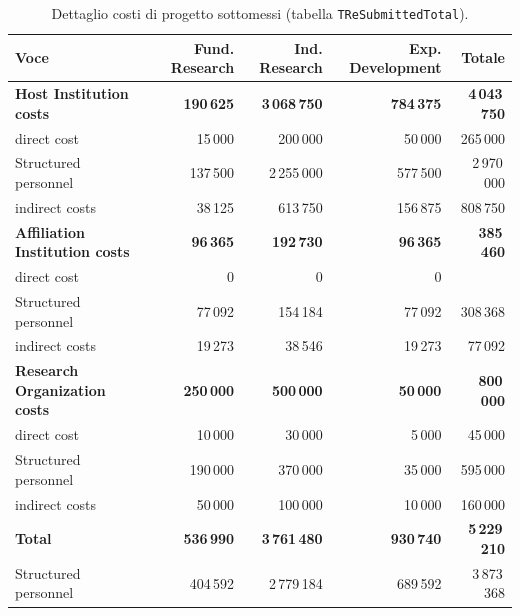 \documentclass{plan4ari_report}
\begin{document}
\begin{table}[H]\centering\small
\caption{Dettaglio costi di progetto sottomessi (tabella \texttt{TReSubmittedTotal}).}\label{tab:age-cost}
\begin{tabular}{lrrrr}\toprule
\textbf{Voce} & \textbf{Fund. Research} & \textbf{Ind. Research} & \textbf{Exp. Development} & \textbf{Totale} \\\midrule
\textbf{Host Institution costs} & \textbf{190\,625} & \textbf{3\,068\,750} & \textbf{784\,375} & \textbf{4\,043\,750} \\
\quad direct cost & 15\,000 & 200\,000 & 50\,000 & 265\,000 \\
\quad Structured personnel & 137\,500 & 2\,255\,000 & 577\,500 & 2\,970\,000 \\
\quad indirect costs & 38\,125 & 613\,750 & 156\,875 & 808\,750 \\
\textbf{Affiliation Institution costs} & \textbf{96\,365} & \textbf{192\,730} & \textbf{96\,365} & \textbf{385\,460} \\
\quad direct cost & 0 & 0 & 0 &  \\
\quad Structured personnel & 77\,092 & 154\,184 & 77\,092 & 308\,368 \\
\quad indirect costs & 19\,273 & 38\,546 & 19\,273 & 77\,092 \\
\textbf{Research Organization costs} & \textbf{250\,000} & \textbf{500\,000} & \textbf{50\,000} & \textbf{800\,000} \\
\quad direct cost & 10\,000 & 30\,000 & 5\,000 & 45\,000 \\
\quad Structured personnel & 190\,000 & 370\,000 & 35\,000 & 595\,000 \\
\quad indirect costs & 50\,000 & 100\,000 & 10\,000 & 160\,000 \\
\midrule
\textbf{Total} & \textbf{536\,990} & \textbf{3\,761\,480} & \textbf{930\,740} & \textbf{5\,229\,210} \\
\quad Structured personnel & 404\,592 & 2\,779\,184 & 689\,592 & 3\,873\,368 \\
\bottomrule\end{tabular}
\end{table}



\end{document}
